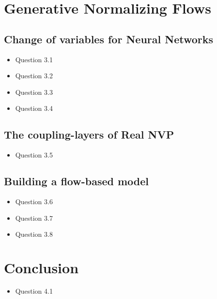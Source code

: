 \documentclass{article}
\begin{document}
  \section{Generative Normalizing Flows}
      \subsection{Change of variables for Neural Networks}
        \begin{itemize}
          \item Question 3.1
          \item Question 3.2
          \item Question 3.3
          \item Question 3.4
        \end{itemize}
      \subsection{The coupling-layers of Real NVP}
        \begin{itemize}
          \item Question 3.5
        \end{itemize}
      \subsection{Building a flow-based model}
        \begin{itemize}
          \item Question 3.6
          \item Question 3.7
          \item Question 3.8
        \end{itemize}
  \section{Conclusion}
        \begin{itemize}
          \item Question 4.1
        \end{itemize}
    
\end{document}
